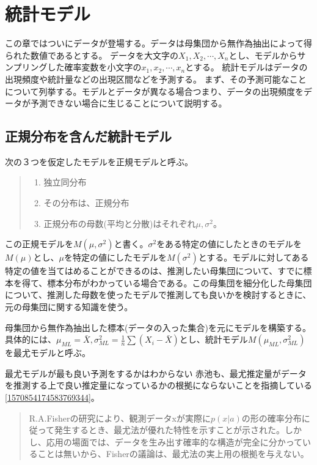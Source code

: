 \chapter{統計モデル}
この章ではついにデータが登場する。データは母集団から無作為抽出によって得られた数値であるとする。
データを大文字の$X_1,X_2,\cdots,X_n$とし、モデルからサンプリングした確率変数を小文字の$x_1,x_2,\cdots,x_n$とする。
統計モデルはデータの出現頻度や統計量などの出現区間などを予測する。
まず、その予測可能なことについて列挙する。モデルとデータが異なる場合つまり、データの出現頻度をデータが予測できない場合に生じることについて説明する。

\section{正規分布を含んだ統計モデル}
次の３つを仮定したモデルを正規モデルと呼ぶ。
\begin{quote}
    \begin{enumerate}[(1)]
    \item 独立同分布
    \item その分布は、正規分布
    \item 正規分布の母数(平均と分散)はそれぞれ$\mu,\sigma^2$。
    \end{enumerate}
\end{quote}
この正規モデルを$M(\mu,\sigma^2)$と書く。$\sigma^2$をある特定の値にしたときのモデルを$M(\mu)$とし、$\mu$を特定の値にしたモデルを$M(\sigma^2)$とする。モデルに対してある特定の値を当てはめることができるのは、推測したい母集団について、すでに標本を得て、標本分布がわかっている場合である。この母集団を細分化した母集団について、推測した母数を使ったモデルで推測しても良いかを検討するときに、元の母集団に関する知識を使う。

母集団から無作為抽出した標本(データの入った集合)を元にモデルを構築する。具体的には、$\mu_{ML}=\bar{X},\sigma^2_{ML}=\frac{1}{n}\sum(X_i-\bar{X})$とし、統計モデル$M(\mu_{ML},\sigma^2_{ML})$を最尤モデルと呼ぶ。

\begin{SMbox}{最尤モデルが最も良い予測をするかはわからない}
赤池も、最尤推定量がデータを推測する上で良い推定量になっているかの根拠にならないことを指摘している\ref{1570854174583769344}。
    \begin{quote}
    R.A.Fisherの研究により、観測データxが実際に$p(x|a)$の形の確率分布に従って発生するとき、最尤法が優れた特性を示すことが示された。しかし、応用の場面では、データを生み出す確率的な構造が完全に分かっていることは無いから、Fisherの議論は、最尤法の実上用の根拠を与えない。
    \end{quote}
\end{SMbox}

